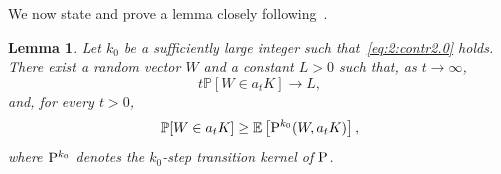 \documentclass[preprint,12pt]{elsarticle}
\newtheorem{lem}[thm]{Lemma}
\theoremstyle{definition}
\theoremstyle{remark}
\newcommand{\Wbf}{{ W}}
\newcommand{\1}{{\mathbf 1}}
\numberwithin{equation}{section}
\newcommand{\Ebb}{\mathbb{E}}  %
\newcommand{\Pbb}{\mathbb{P}}
\newcommand{\Prm}{{\rm P}}
\begin{document}
  We now state and prove a lemma closely following~\cite[Lemma~3]{grey1994regular}.

  \begin{lem}\label{lem:4:supsol}
    Let $k_0$ be a sufficiently large integer such that~\eqref{eq:2:contr2.0} holds.
    There exist a random vector $\Wbf$ and a constant $L>0$ such that, as $t\to\infty$,
    \begin{equation*}
      t \Pbb[\Wbf \in a_tK] \to L,
    \end{equation*}
    and, for every $t>0$,
    \begin{equation*}
      \Pbb[\Wbf \in a_t K] \geq \Ebb\left[\Prm^{k_0}(\Wbf, a_t K)\right],
    \end{equation*}
    where $\Prm^{k_0}$ denotes the $k_0$-step transition kernel of $\Prm$.
  \end{lem}
\end{document}
